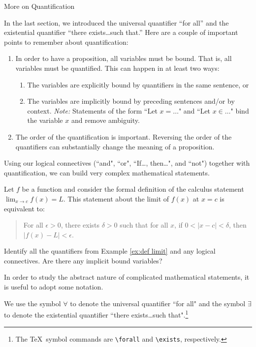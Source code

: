 \begin{section}{More on Quantification}

In the last section, we introduced the universal quantifier ``for all'' and the existential quantifier ``there exists\ldots such that.''  Here are a couple of important points to remember about quantification:
\begin{enumerate}
\item In order to have a proposition, all variables must be bound.  That is, all variables must be quantified.  This can happen in at least two ways:
\begin{enumerate}
\item The variables are explicitly bound by quantifiers in the same sentence, or
\item The variables are implicitly bound by preceding sentences and/or by context.  \emph{Note:}  Statements of the form ``Let $x=\ldots$" and ``Let $x\in\ldots$" bind the variable $x$ and remove ambiguity.
\end{enumerate}
\item The order of the quantification is important.  Reversing the order of the quantifiers can substantially change the meaning of a proposition.
\end{enumerate}

Using our logical connectives (``and", ``or", ``If\ldots, then\ldots", and ``not") together with quantification, we can build very complex mathematical statements.

\begin{example}\label{ex:def limit}
Let $f$ be a function and consider the formal definition of the
calculus statement $\displaystyle\lim_{x\to c}f(x)=L$.
This statement about the limit of $f(x)$ at $x=c$ is equivalent to:
\begin{quote}
For all $\epsilon >0$, there exists $\delta >0$ such that for all $x$,
if $0<|x-c|<\delta$, then $|f(x)-L|<\epsilon$.
\end{quote}
\end{example}

\begin{exercise}
Identify all the quantifiers from Example \ref{ex:def limit} and any logical connectives.  Are there any implicit bound variables?
\end{exercise}

In order to study the abstract nature of complicated mathematical statements, it is useful to adopt some notation.

\begin{definition}
We use the symbol $\forall$ to denote the universal quantifier ``for all" and the symbol $\exists$ to denote the existential quantifier ``there exists\ldots such that".\footnote{The \TeX\ symbol commands are \texttt{\textbackslash forall} and \texttt{\textbackslash exists}, respectively.}
\end{definition}


\end{section}
